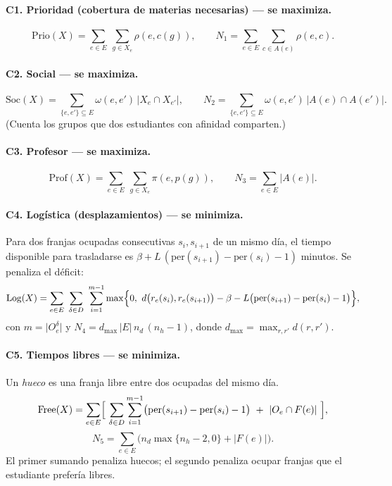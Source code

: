 \documentclass[11pt,letterpaper]{article}
\theoremstyle{definition}
\theoremstyle{remark}
\theoremstyle{plain}
\newcommand{\card}[1]{\lvert #1 \rvert}
\begin{document}
\paragraph{C1. Prioridad (cobertura de materias necesarias) --- se maximiza.}
\[
\mathrm{Prio}(X)=\sum_{e\in E}\ \sum_{g\in X_e}\rho(e,c(g)),
\qquad N_1=\sum_{e\in E}\sum_{c\in A(e)}\rho(e,c).
\]

\paragraph{C2. Social --- se maximiza.}
\[
\mathrm{Soc}(X)=\sum_{\{e,e'\}\subseteq E}\omega(e,e')\,\card{X_e\cap X_{e'}},
\qquad N_2=\sum_{\{e,e'\}\subseteq E}\omega(e,e')\,\card{A(e)\cap A(e')}.
\]
(Cuenta los grupos que dos estudiantes con afinidad comparten.)

\paragraph{C3. Profesor --- se maximiza.}
\[
\mathrm{Prof}(X)=\sum_{e\in E}\ \sum_{g\in X_e}\pi(e,p(g)),
\qquad N_3=\sum_{e\in E}\card{A(e)}.
\]

\paragraph{C4. Logística (desplazamientos) --- se minimiza.}
Para dos franjas ocupadas consecutivas $s_i,s_{i+1}$ de un mismo día, el
tiempo disponible para trasladarse es
$\beta+L\,(\mathrm{per}(s_{i+1})-\mathrm{per}(s_i)-1)$ minutos. Se penaliza el
déficit:
\[
\mathrm{Log}(X)=\sum_{e\in E}\ \sum_{\delta\in D}\ \sum_{i=1}^{m-1}
\max\Bigl\{0,\ d\bigl(r_e(s_i),r_e(s_{i+1})\bigr)-\beta-L\bigl(\mathrm{per}(s_{i+1})-\mathrm{per}(s_i)-1\bigr)\Bigr\},
\]
con $m=\card{O_e^\delta}$ y $N_4=d_{\max}\,\card{E}\,n_d\,(n_h-1)$, donde
$d_{\max}=\max_{r,r'}d(r,r')$.

\paragraph{C5. Tiempos libres --- se minimiza.}
Un \emph{hueco} es una franja libre entre dos ocupadas del mismo día.
\[
\mathrm{Free}(X)=\sum_{e\in E}\Bigl[\ \sum_{\delta\in D}\sum_{i=1}^{m-1}\bigl(\mathrm{per}(s_{i+1})-\mathrm{per}(s_i)-1\bigr)\ +\ \card{O_e\cap F(e)}\ \Bigr],
\]
\[
N_5=\sum_{e\in E}\bigl(n_d\max\{n_h-2,0\}+\card{F(e)}\bigr).
\]
El primer sumando penaliza huecos; el segundo penaliza ocupar franjas que el
estudiante prefería libres.
\end{document}
